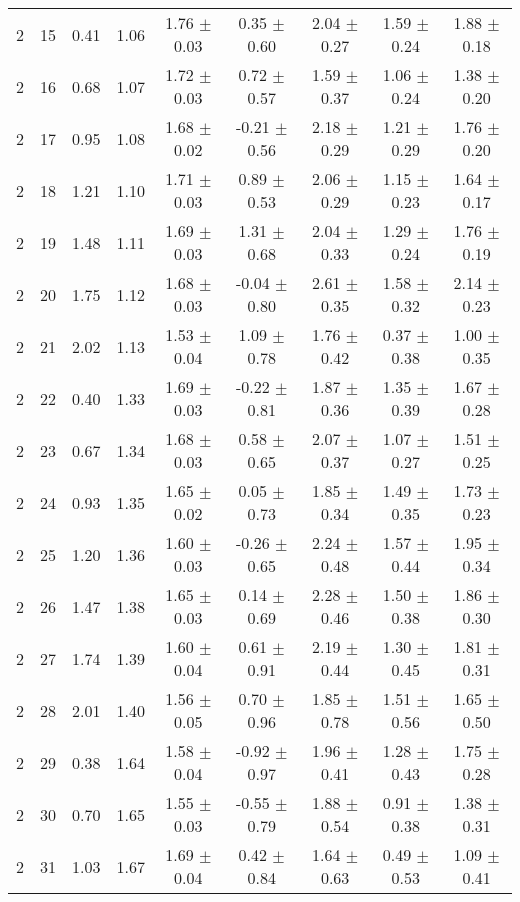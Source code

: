 \begin{landscape}
\begin{longtable}{ccccccccc}
   2 & 15 & 0.41 & 1.06 & 1.76 $\pm$ 0.03 & 0.35 $\pm$ 0.60 & 2.04 $\pm$ 0.27 & 1.59 $\pm$ 0.24 & 1.88 $\pm$ 0.18\\
   2 & 16 & 0.68 & 1.07 & 1.72 $\pm$ 0.03 & 0.72 $\pm$ 0.57 & 1.59 $\pm$ 0.37 & 1.06 $\pm$ 0.24 & 1.38 $\pm$ 0.20\\
   2 & 17 & 0.95 & 1.08 & 1.68 $\pm$ 0.02 & -0.21 $\pm$ 0.56 & 2.18 $\pm$ 0.29 & 1.21 $\pm$ 0.29 & 1.76 $\pm$ 0.20\\
   2 & 18 & 1.21 & 1.10 & 1.71 $\pm$ 0.03 & 0.89 $\pm$ 0.53 & 2.06 $\pm$ 0.29 & 1.15 $\pm$ 0.23 & 1.64 $\pm$ 0.17\\
   2 & 19 & 1.48 & 1.11 & 1.69 $\pm$ 0.03 & 1.31 $\pm$ 0.68 & 2.04 $\pm$ 0.33 & 1.29 $\pm$ 0.24 & 1.76 $\pm$ 0.19\\
   2 & 20 & 1.75 & 1.12 & 1.68 $\pm$ 0.03 & -0.04 $\pm$ 0.80 & 2.61 $\pm$ 0.35 & 1.58 $\pm$ 0.32 & 2.14 $\pm$ 0.23\\
   2 & 21 & 2.02 & 1.13 & 1.53 $\pm$ 0.04 & 1.09 $\pm$ 0.78 & 1.76 $\pm$ 0.42 & 0.37 $\pm$ 0.38 & 1.00 $\pm$ 0.35\\
   2 & 22 & 0.40 & 1.33 & 1.69 $\pm$ 0.03 & -0.22 $\pm$ 0.81 & 1.87 $\pm$ 0.36 & 1.35 $\pm$ 0.39 & 1.67 $\pm$ 0.28\\
   2 & 23 & 0.67 & 1.34 & 1.68 $\pm$ 0.03 & 0.58 $\pm$ 0.65 & 2.07 $\pm$ 0.37 & 1.07 $\pm$ 0.27 & 1.51 $\pm$ 0.25\\
   2 & 24 & 0.93 & 1.35 & 1.65 $\pm$ 0.02 & 0.05 $\pm$ 0.73 & 1.85 $\pm$ 0.34 & 1.49 $\pm$ 0.35 & 1.73 $\pm$ 0.23\\
   2 & 25 & 1.20 & 1.36 & 1.60 $\pm$ 0.03 & -0.26 $\pm$ 0.65 & 2.24 $\pm$ 0.48 & 1.57 $\pm$ 0.44 & 1.95 $\pm$ 0.34\\
   2 & 26 & 1.47 & 1.38 & 1.65 $\pm$ 0.03 & 0.14 $\pm$ 0.69 & 2.28 $\pm$ 0.46 & 1.50 $\pm$ 0.38 & 1.86 $\pm$ 0.30\\
   2 & 27 & 1.74 & 1.39 & 1.60 $\pm$ 0.04 & 0.61 $\pm$ 0.91 & 2.19 $\pm$ 0.44 & 1.30 $\pm$ 0.45 & 1.81 $\pm$ 0.31\\
   2 & 28 & 2.01 & 1.40 & 1.56 $\pm$ 0.05 & 0.70 $\pm$ 0.96 & 1.85 $\pm$ 0.78 & 1.51 $\pm$ 0.56 & 1.65 $\pm$ 0.50\\
   2 & 29 & 0.38 & 1.64 & 1.58 $\pm$ 0.04 & -0.92 $\pm$ 0.97 & 1.96 $\pm$ 0.41 & 1.28 $\pm$ 0.43 & 1.75 $\pm$ 0.28\\
   2 & 30 & 0.70 & 1.65 & 1.55 $\pm$ 0.03 & -0.55 $\pm$ 0.79 & 1.88 $\pm$ 0.54 & 0.91 $\pm$ 0.38 & 1.38 $\pm$ 0.31\\
   2 & 31 & 1.03 & 1.67 & 1.69 $\pm$ 0.04 & 0.42 $\pm$ 0.84 & 1.64 $\pm$ 0.63 & 0.49 $\pm$ 0.53 & 1.09 $\pm$ 0.41\\

\end{longtable}
\end{landscape}
